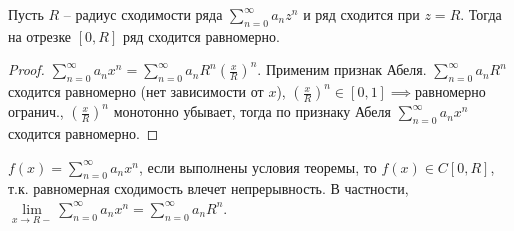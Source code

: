 \begin{theorem}[Абеля] \thmslashn

	Пусть $R$ -- радиус сходимости ряда $\sum_{n = 0}^{\infty}a_nz^n$ и ряд сходится при $z = R$. Тогда на отрезке $[0, R]$ ряд сходится равномерно.
	\begin{proof} \thmslashn
		
		$\sum_{n = 0}^{\infty}a_nx^n = \sum_{n = 0}^{\infty}a_nR^n\left(\frac{x}{R}\right)^n$. Применим признак Абеля. $\sum_{n = 0}^{\infty}a_nR^n$ сходится равномерно (нет зависимости от $x$), $\left(\frac{x}{R}\right)^n \in [0, 1] \implies$равномерно огранич., $\left(\frac{x}{R}\right)^n$ монотонно убывает, тогда по признаку Абеля $\sum_{n = 0}^{\infty}a_nx^n$ сходится равномерно.
	\end{proof}
\end{theorem}

\begin{consequence} \thmslashn

	$f(x) = \sum_{n = 0}^{\infty}a_nx^n$, если выполнены условия теоремы, то $f(x) \in C[0, R]$, т.к. равномерная сходимость влечет непрерывность. В частности, $\lim\limits_{x \to R-} \sum_{n = 0}^{\infty}a_nx^n = \sum_{n = 0}^{\infty}a_nR^n$.
\end{consequence}
